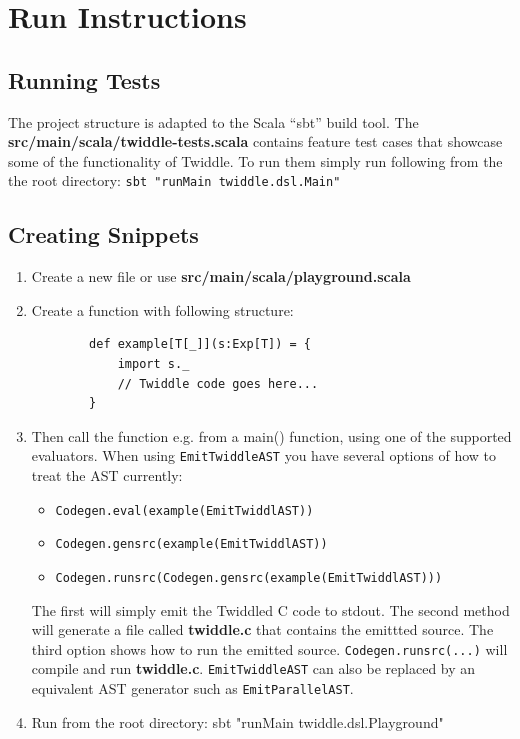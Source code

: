 \documentclass{article}
\begin{document}
\section{Run Instructions}
\subsection{Running Tests}
The project structure is adapted to the Scala ``sbt'' build tool. The \textbf{src/main/scala/twiddle-tests.scala} contains feature test cases that showcase some of the functionality of Twiddle. To run them simply
run following from the the root directory: \texttt{sbt "runMain twiddle.dsl.Main"}

\subsection{Creating Snippets}
\begin{enumerate}
	\item Create a new file or use \textbf{src/main/scala/playground.scala}
	\item Create a function with following structure:
	\begin{verbatim}
		def example[T[_]](s:Exp[T]) = {
		    import s._
		    // Twiddle code goes here...
		}
	\end{verbatim}
	\item Then call the function e.g. from a main() function, using one of the supported evaluators. When using \texttt{EmitTwiddleAST} you have several options of how to treat the AST currently:
	\begin{itemize}
		\item \texttt{Codegen.eval(example(EmitTwiddlAST))}
		\item \texttt{Codegen.gensrc(example(EmitTwiddlAST))}
		\item \texttt{Codegen.runsrc(Codegen.gensrc(example(EmitTwiddlAST)))}
	\end{itemize}
	The first will simply emit the Twiddled C code to stdout. The second method will generate a file called	\textbf{twiddle.c} that contains the emittted source. The third option shows how to run the emitted source. \texttt{Codegen.runsrc(...)} will compile and run \textbf{twiddle.c}.
	\texttt{EmitTwiddleAST} can also be replaced by an equivalent AST generator such as \texttt{EmitParallelAST}.

	\item Run from the root directory: sbt "runMain twiddle.dsl.Playground"
\end{enumerate}
\end{document}
